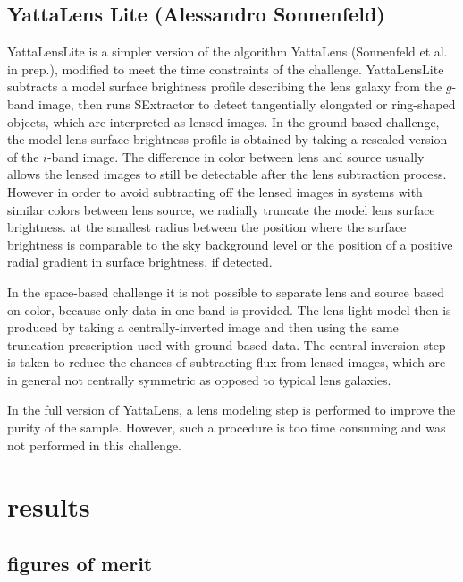 \documentclass[useAMS,usenatbib]{mn2e}
\begin{document}
\subsection{YattaLens Lite (Alessandro Sonnenfeld)}
YattaLensLite is a simpler version of the algorithm YattaLens (Sonnenfeld et al. in prep.), modified to meet the time constraints of the challenge.
YattaLensLite subtracts a model surface brightness profile describing the lens galaxy from the $g$-band image, then runs SExtractor to detect tangentially elongated or ring-shaped objects, which are interpreted as lensed images.
In the ground-based challenge, the model lens surface brightness profile is obtained by taking a rescaled version of the $i$-band image.
The difference in color between lens and source usually allows the lensed images to still be detectable after the lens subtraction process.
However in order to avoid subtracting off the lensed images in systems with similar colors between lens source, we radially truncate the model lens surface brightness.
at the smallest radius between the position where the surface brightness is comparable to the sky background level or the position of a positive radial gradient in surface brightness, if detected.

In the space-based challenge it is not possible to separate lens and source based on color, because only data in one band is provided. The lens light model then is produced by taking a centrally-inverted image and then using the same truncation prescription used with ground-based data. The central inversion step is taken to reduce the chances of subtracting flux from lensed images, which are in general not centrally symmetric as opposed to typical lens galaxies.

In the full version of YattaLens, a lens modeling step is performed to improve the purity of the sample. However, such a procedure is too time consuming and was not performed in this challenge.

\section{results}

\subsection{figures of merit}
\end{document}
